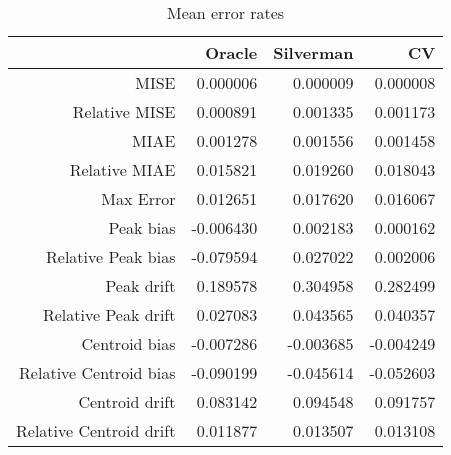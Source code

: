 \begin{table}[ht]
\centering
\begin{tabular}{rrrr}
  \hline
 & Oracle & Silverman & CV \\ 
  \hline
MISE & 0.000006 & 0.000009 & 0.000008 \\ 
  Relative MISE & 0.000891 & 0.001335 & 0.001173 \\ 
  MIAE & 0.001278 & 0.001556 & 0.001458 \\ 
  Relative MIAE & 0.015821 & 0.019260 & 0.018043 \\ 
  Max Error & 0.012651 & 0.017620 & 0.016067 \\ 
  Peak bias & -0.006430 & 0.002183 & 0.000162 \\ 
  Relative Peak bias & -0.079594 & 0.027022 & 0.002006 \\ 
  Peak drift & 0.189578 & 0.304958 & 0.282499 \\ 
  Relative Peak drift & 0.027083 & 0.043565 & 0.040357 \\ 
  Centroid bias & -0.007286 & -0.003685 & -0.004249 \\ 
  Relative Centroid bias & -0.090199 & -0.045614 & -0.052603 \\ 
  Centroid drift & 0.083142 & 0.094548 & 0.091757 \\ 
  Relative Centroid drift & 0.011877 & 0.013507 & 0.013108 \\ 
   \hline
\end{tabular}
\caption{Mean error rates} 
\label{tbl:mean_error_rates}
\end{table}
